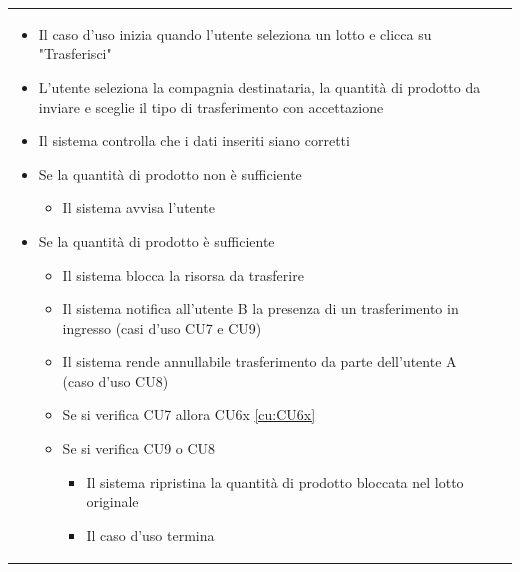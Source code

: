 \documentclass[a4paper,11pt]{article}
\begin{document}
\begin{longtable}{|m{2cm}|m{10.5cm}|}
  \begin{itemize}
    \item Il caso d'uso inizia quando l'utente seleziona un lotto e clicca su "Trasferisci"
    \item L'utente seleziona la compagnia destinataria, la quantità di prodotto da inviare e sceglie il tipo di trasferimento con accettazione
    \item Il sistema controlla che i dati inseriti siano corretti
    \item Se la quantità di prodotto non è sufficiente
          \begin{itemize}
            \item Il sistema avvisa l'utente
          \end{itemize}
    \item Se la quantità di prodotto è sufficiente
          \begin{itemize}
            \item Il sistema blocca la risorsa da trasferire
            \item Il sistema notifica all'utente B la presenza di un trasferimento in ingresso (casi d'uso CU7 e CU9)
            \item Il sistema rende annullabile trasferimento da parte dell'utente A (caso d'uso CU8)
            \item Se si verifica CU7 allora CU6x \ref{cu:CU6x}
            \item Se si verifica CU9 o CU8
                  \begin{itemize}
                    \item Il sistema ripristina la quantità di prodotto bloccata nel lotto originale
                    \item Il caso d'uso termina
                  \end{itemize}
          \end{itemize}
  \end{itemize}


\end{longtable}
\end{document}
